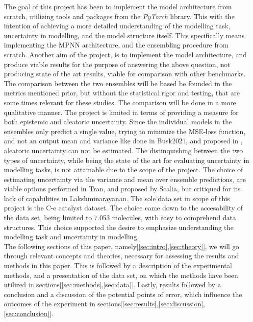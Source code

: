 The goal of this project has been to implement the model architecture from scratch, utilizing tools and packages from the
\textit{PyTorch} library. This with the intention of achieving a more detailed understanding of the modelling task, uncertainty in modelling,
and the model structure itself. This specifically means implementing the MPNN architecture\cite{PAINN}, and the ensembling procedure from
scratch. Another aim of the project, is to implement the model architecture, and produce viable results for the purpose of answering the
above question, not producing state of the art results, viable for comparison with other benchmarks.
The comparison between the two ensembles will be based be founded in the metrics mentioned prior, but without the statistical rigor and testing, that 
are some times relevant for these studies. The comparison will be done in a more qualitative manner.
The project is limited in terms of providing a measure for both epistemic and aleatoric uncertainty. Since the individual models in the ensembles
only predict a single value, trying to minimize the MSE-loss function, and not an output mean and variance like done in Busk2021\cite{Busk2021}, and
proposed in \cite{Lakshminarayanan2016}, aleatoric uncertainty can not be estimated. The distinquishing between the two types of uncertainty,
while being the state of the art for evaluating uncertainty in modelling tasks, is not attainable due to the scope of the project.
The choice of estimating uncertainty via the variance and mean over ensemble predictions, are viable options performed in Tran\cite{Tran2019},
and proposed by Scalia\cite{Scalia2019}, but critiqued for its lack of capabilities in Lakshminarayanan\cite{Lakshminarayanan2016}.
The sole data set in scope of this project is the C-c catalyst dataset\cite{Meyer2018}. The choice came down to the accesability of the data set,
being limited to 7.053 molecules, with easy to comprehend data structures. This choice supported the desire to emphasize understanding the
modelling task and uncertainty in modelling. \\

The following sections of this paper, namely[\ref{sec:intro},\ref{sec:theory}],
we will go through relevant concepts and theories, necessary for assessing the results and methods in this paper.
This is followed by a description of the experimental methods, and a presentation of the data set,
on which the methods have been utilized in sections[\ref{sec:methods},\ref{sec:data}].
Lastly, results followed by a conclusion and a discussion of the potential points of error,
which influence the outcomes of the experiment in sections[\ref{sec:results},\ref{sec:discussion},\ref{sec:conclusion}].

\newpage


